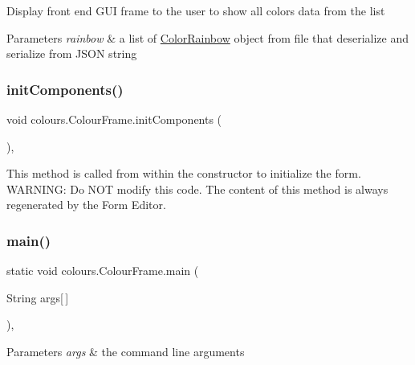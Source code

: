 Display front end G\+UI frame to the user to show all colors data from the list 
\begin{DoxyParams}{Parameters}
{\em rainbow} & a list of \hyperlink{classcolours_1_1_color_rainbow}{Color\+Rainbow} object from file that deserialize and serialize from J\+S\+ON string \\
\hline
\end{DoxyParams}
\mbox{\label{classcolours_1_1_colour_frame_aa654076ec5e365557e85b7ba8e3dae47}} 
\subsubsection{\texorpdfstring{init\+Components()}{initComponents()}}
{\footnotesize\ttfamily void colours.\+Colour\+Frame.\+init\+Components (\begin{DoxyParamCaption}{ }\end{DoxyParamCaption})\hspace{0.3cm}{\ttfamily [inline]}, {\ttfamily [private]}}

This method is called from within the constructor to initialize the form. W\+A\+R\+N\+I\+NG\+: Do N\+OT modify this code. The content of this method is always regenerated by the Form Editor. \mbox{\label{classcolours_1_1_colour_frame_a7f890970aa168fcb9791f1de589a5c2c}} 
\subsubsection{\texorpdfstring{main()}{main()}}
{\footnotesize\ttfamily static void colours.\+Colour\+Frame.\+main (\begin{DoxyParamCaption}\item[{String}]{args\mbox{[}$\,$\mbox{]} }\end{DoxyParamCaption})\hspace{0.3cm}{\ttfamily [inline]}, {\ttfamily [static]}}


\begin{DoxyParams}{Parameters}
{\em args} & the command line arguments \\
\hline
\end{DoxyParams}


